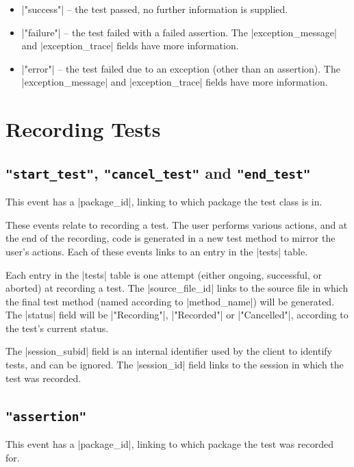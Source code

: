 \documentclass{report}
\begin{document}
\begin{itemize}
\item |"success"| -- the test passed, no further information is supplied.
\item |"failure"| -- the test failed with a failed assertion.  The
  |exception_message| and |exception_trace| fields have more information.
\item |"error"| -- the test failed due to an exception (other than an assertion).  The
  |exception_message| and |exception_trace| fields have more information.
\end{itemize}

\section{Recording Tests}

\subsection{\lstinline!"start_test"!, \lstinline!"cancel_test"! and \lstinline!"end_test"!}

This event has a |package_id|, linking to which package the test class
is in.

These events relate to recording a test.  The user performs various actions,
and at the end of the recording, code is generated in a new test method to
mirror the user's actions.  Each of these events links to an entry in the
|tests| table.


Each entry in the |tests| table is one attempt (either ongoing, successful, or
aborted) at recording a test.  The |source_file_id| links to the source file
in which the final test method (named according to |method_name|) will be
generated.  The |status| field will be |"Recording"|, |"Recorded"| or
|"Cancelled"|, according to the test's current status.

The |session_subid| field is an internal identifier used by the client to
identify tests, and can be ignored.  The |session_id| field links to the
session in which the test was recorded.

\subsection{\lstinline!"assertion"!}

This event has a |package_id|, linking to which package the test was
recorded for.
\end{document}
